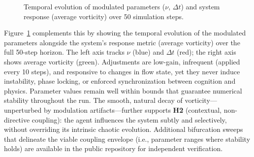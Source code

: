 \documentclass[12pt,a4paper]{article}
\begin{document}
\begin{figure}[htbp]
\centering
{}
\caption{Temporal evolution of modulated parameters ($\nu$, $\Delta t$) and system response (average vorticity) over 50 simulation steps.}
\label{fig:coupling_dynamics}
\end{figure}

Figure~\ref{fig:coupling_dynamics} complements this by showing the temporal evolution of the modulated parameters alongside the system's response metric (average vorticity) over the full 50-step horizon. The left axis tracks $\nu$ (blue) and $\Delta t$ (red); the right axis shows average vorticity (green). Adjustments are low-gain, infrequent (applied every 10 steps), and responsive to changes in flow state, yet they never induce instability, phase locking, or enforced synchronization between cognition and physics. Parameter values remain well within bounds that guarantee numerical stability throughout the run. The smooth, natural decay of vorticity—unperturbed by modulation artifacts—further supports \textbf{H2} (contextual, non-directive coupling): the agent influences the system subtly and selectively, without overriding its intrinsic chaotic evolution. Additional bifurcation sweeps that delineate the viable coupling envelope (i.e., parameter ranges where stability holds) are available in the public repository for independent verification.
\end{document}

